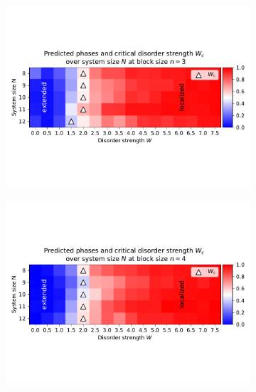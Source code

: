 \documentclass[reprint,amsmath,amssymb,aps,prb]{revtex4-2}
\begin{document}
\begin{center}
\begin{figure}[h]
\begin{subfigure}[c]{0.4\textwidth}
			\includegraphics[width=\textwidth, trim={0 3cm 0 3cm},clip]{../results/Wc/n3_Wc_N_dependency.pdf}
		\end{subfigure}
		\begin{subfigure}[c]{0.4\textwidth}
			\includegraphics[width=\textwidth, trim={0 3cm 0 3cm},clip]{../results/Wc/n4_Wc_N_dependency.pdf}
		\end{subfigure}
		\begin{subfigure}[c]{0.4\textwidth}

\end{subfigure}
\end{figure}
\end{center}
\end{document}
